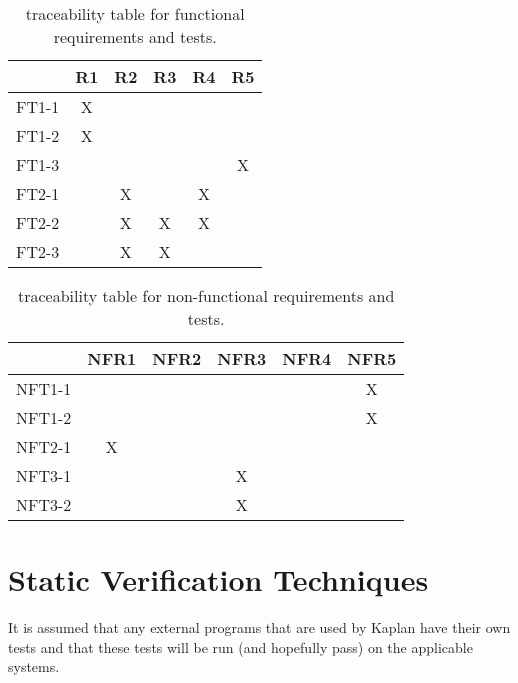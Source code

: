 \documentclass[12pt, titlepage]{article}
\newcommand{\progname}{Kaplan} %
\begin{document}
\begin{table}[H]
	\begin{center}
	\begin{tabular}{|l|c|c|c|c|c|}
		\hline
		& R1 & R2 & R3 & R4 & R5 \\
		\hline
		FT1-1 & X  &    &    &    &    \\
		\hline
		FT1-2 & X  &    &    &    &    \\
		\hline
		FT1-3 &    &    &    &    & X  \\
		\hline
		FT2-1 &    & X  &    & X  &    \\
		\hline
		FT2-2 &    & X  & X  & X  &    \\
		\hline
		FT2-3 &    & X  & X  &    &   \\
		\hline
	\end{tabular}
\end{center}
\caption{traceability table for functional requirements and tests.}
\end{table}

\begin{table}[H]
	\begin{center}
	\begin{tabular}{|l|c|c|c|c|c|}
		\hline
		& NFR1 & NFR2 & NFR3 & NFR4 & NFR5 \\
		\hline
		NFT1-1 &      &      &      &      & X    \\
		\hline
		NFT1-2  &      &      &      &      & X    \\
		\hline
		NFT2-1 & X    &      &      &      &      \\
		\hline
		NFT3-1 &      &      & X    &      &      \\
		\hline
		NFT3-2 &      &      & X    &      &     \\
		\hline
	\end{tabular}
\end{center}
\caption{traceability table for non-functional requirements and tests.}
\end{table}

\section{Static Verification Techniques}


It is assumed that any external programs that are used by \progname{} have 
their own tests and that these tests will be run (and hopefully pass) on the 
applicable systems.
\end{document}
